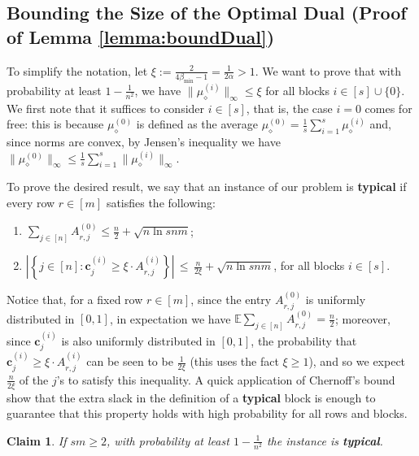 \documentclass{article}
\newcommand{\E}{\mathbb{E}}
\newcommand{\ev}[0]{\mathbf{e}}
\newcommand{\cv}[0]{\mathbf{c}}
\newcommand{\bv}[0]{\mathbf{b}}
\newtheorem{claim}[thm]{Claim}
\begin{document}
\subsection{Bounding the Size of the Optimal Dual (Proof of Lemma \ref{lemma:boundDual})}

\label{sec:bound_dual}

To simplify the notation, let $\xi := \frac{2}{4 \beta_{\min}-1}= \frac{1}{2\alpha} > 1$. We want to prove that with probability at least $1 - \frac{1}{n^2}$, we have $\|\mu^{(i)}_{\diamond}\|_{\infty} \le \xi$ for all blocks $i \in [s] \cup \{0\}$. We first note that it suffices to consider $i \in [s]$, that is, the case $i=0$ comes for free: this is because $\mu^{(0)}_{\diamond}$ is defined as the average $\mu^{(0)}_{\diamond}=\frac{1}{s} \sum_{i = 1}^s \mu^{(i)}_{\diamond}$ and, since norms are convex, by Jensen's inequality we have $\|\mu^{(0)}_{\diamond}\|_{\infty} \le \frac{1}{s} \sum_{i=1}^s \|\mu^{(i)}_{\diamond}\|_{\infty}$.

To prove the desired result, we say that an instance of our problem is \textbf{typical} if every row $r \in [m]$ satisfies the following:
\vspace{-2pt}
    \begin{enumerate}
    \item $ \sum_{j \in [n]} A^{(0)}_{r,j} \leq \frac{n}{2} + \sqrt{n \ln s n m}$;
    \item $\left|\left\{j \in [n]: \cv^{(i)}_j \ge \xi
    \cdot A^{(i)}_{r,j}\right\}\right| \,\le\, \frac{n}{2 \xi} + \sqrt{n \ln s n m}$,  for all blocks $i \in [s]$.
    \end{enumerate}


Notice that, for a fixed row $r \in [m]$, since the entry $A^{(0)}_{r,j}$ is uniformly distributed in $[0,1]$, in expectation we have $\E \sum_{j \in [n]} A^{(0)}_{r,j} = \frac{n}{2}$; moreover, since $\cv^{(i)}_j$ is also uniformly distributed in $[0,1]$, the probability that $\cv^{(i)}_j \ge \xi \cdot A^{(i)}_{r,j}$ can be seen to be $\frac{1}{2\xi}$ (this uses the fact $\xi \ge 1$), and so we expect $\frac{n}{2 \xi}$ of the $j$'s to satisfy this inequality. A quick application of Chernoff's bound show that the extra slack in the definition of a \textbf{typical} block is enough to guarantee that this property holds with high probability for all rows and blocks. 

\begin{claim} \label{claim:typicalBlocks}
    If $sm \geq 2 $, with probability at least $1 - \frac{1}{n^2}$ the instance is \textbf{typical}.   
\end{claim}
\end{document}

